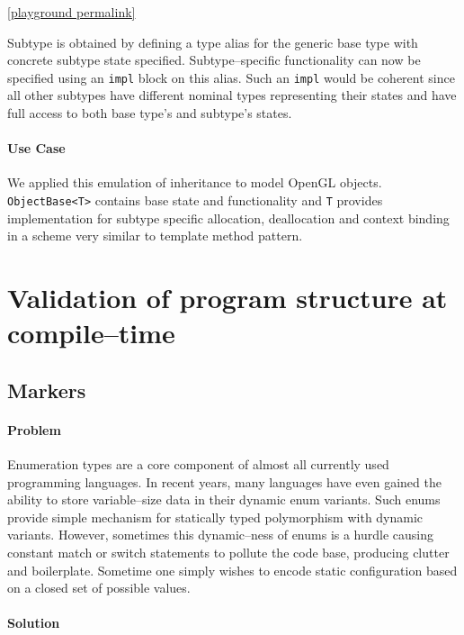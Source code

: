 \noindent \href{https://play.rust-lang.org/?version=stable&mode=debug&edition=2021&gist=8946828515f1f87f388374b6bbc69bca}{[playground permalink]}

Subtype is obtained by defining a type alias for the generic base type with concrete subtype state specified.
Subtype--specific functionality can now be specified using an \texttt{impl} block on this alias.
Such an \texttt{impl} would be coherent since all other subtypes have different nominal types representing their states and have full access to both base type's and subtype's states.

\paragraph{Use Case}

We applied this emulation of inheritance to model OpenGL objects. \texttt{ObjectBase<T>} contains base state and functionality and \texttt{T} provides implementation 
for subtype specific allocation, deallocation and context binding in a scheme very similar to template method pattern.

\section{Validation of program structure at compile--time}

\subsection{Markers}

\paragraph{Problem}

Enumeration types are a core component of almost all currently used programming languages. In recent years, many languages have even gained the ability to store variable--size data in their dynamic enum variants.
Such enums provide simple mechanism for statically typed polymorphism with dynamic variants. 
However, sometimes this dynamic--ness of enums is a hurdle causing constant match or switch statements to pollute the code base, producing clutter and boilerplate.
Sometime one simply wishes to encode static configuration based on a closed set of possible values.

\paragraph{Solution}

